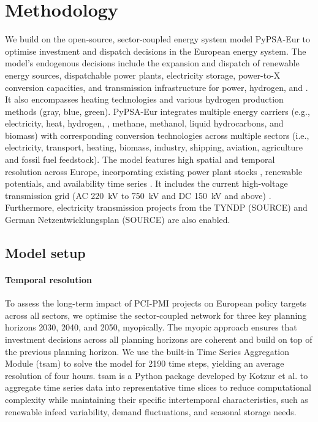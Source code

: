 \documentclass[preprint,12pt,sort&compress]{elsarticle}
\begin{document}
\section{Methodology}
\label{sec:methodology}
We build on the open-source, sector-coupled energy system model PyPSA-Eur \cite{neumannPotentialRoleHydrogen2023,frysztackiComparisonClusteringMethods2022,glaumOffshorePowerHydrogen2024,horschPyPSAEurOpenOptimisation2018} to optimise investment and dispatch decisions in the European energy system. The model's endogenous decisions include the expansion and dispatch of renewable energy sources, dispatchable power plants, electricity storage, power-to-X conversion capacities, and transmission infrastructure for power, hydrogen, and . It also encompasses heating technologies and various hydrogen production methods (gray, blue, green).
PyPSA-Eur integrates multiple energy carriers (e.g., electricity, heat, hydrogen, , methane, methanol, liquid hydrocarbons, and biomass) with corresponding conversion technologies across multiple sectors (i.e., electricity, transport, heating, biomass, industry, shipping, aviation, agriculture and fossil fuel feedstock). The model features high spatial and temporal resolution across Europe, incorporating existing power plant stocks \cite{gotzensPerformingEnergyModelling2019}, renewable potentials, and availability time series \cite{hofmannAtliteLightweightPython2021}. It includes the current high-voltage transmission grid (AC \SI{220}{kV} to \SI{750}{kV} and DC \SI{150}{kV} and above) \cite{xiongModellingHighvoltageGrid2025}. Furthermore, electricity transmission projects from the TYNDP (SOURCE) and German Netzentwicklungsplan (SOURCE) are also enabled.

\subsection{Model setup}
\label{sec:model_setup}


\paragraph{Temporal resolution}
\label{sec:temporal_resolution}
To assess the long-term impact of PCI-PMI projects on European policy targets across all sectors, we optimise the sector-coupled network for three key planning horizons 2030, 2040, and 2050, myopically. The myopic approach ensures that investment decisions across all planning horizons are coherent and build on top of the previous planning horizon. We use the built-in Time Series Aggregation Module (tsam) to solve the model for 2190 time steps, yielding an average resolution of four hours. tsam is a Python package developed by Kotzur et al. \cite{kotzurImpactDifferentTime2018} to aggregate time series data into representative time slices to reduce computational complexity while maintaining their specific intertemporal characteristics, such as renewable infeed variability, demand fluctuations, and seasonal storage needs.
\end{document}
